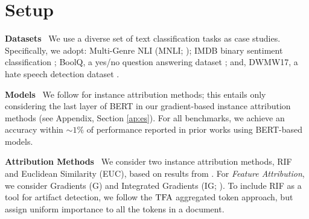 \documentclass[11pt]{article}
\newcommand\para[1]{\vskip 1mm\noindent\textbf{#1}~}
\begin{document}
\section{Setup}
\label{section:setup}

\para{Datasets} 
We use a diverse set of text classification tasks as case studies.
Specifically, we adopt: Multi-Genre NLI (MNLI; \citealt{williams2017broad}); IMDB binary sentiment classification \citep{maas2011learning}; BoolQ, a yes/no question answering dataset \citep{clark2019boolq}; and, DWMW17, a hate speech detection dataset \citep{davidson2017automated}. %


\para{Models} 
We %
follow \citet{pezeshkpour2021empirical} for instance attribution methods; this entails only considering the last layer of BERT in our gradient-based instance attribution methods (see Appendix, Section \ref{ap:es}). 
For all benchmarks, we achieve an accuracy within $\sim$$1\%$ of performance reported in prior works using BERT-based models. %

\para{Attribution Methods}
We consider two instance attribution methods, RIF~\citep{barshan2020relatif} and Euclidean Similarity (EUC), based on results from 
\citet{pezeshkpour2021empirical}. 
For \emph{Feature Attribution}, we consider Gradients (G) and Integrated Gradients (IG; \citealt{sundararajan2017axiomatic}).
To include RIF as a tool for artifact detection, we follow the $\text{TFA}$ aggregated token approach, but assign uniform importance to all the tokens in a document. 
\end{document}
